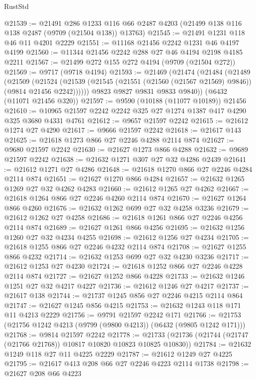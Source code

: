 \begin{lexlean}{RustStd}
\begin{coremodule}
@21539 := @21491
    @286
    @1233
    @116
    @66
    @2487
    @4203
    (@21499 @138 @116 @138 @2487 (@9709 (@21504 @138)) @13763)
@21545 := @21491 @1231 @118 @46 @11 @4201 @2229
@21551 := @11168 @21456 @2242 @1231 @46 @4197 @4199
@21560 := @11344 @21456 @2242 @288 @27 @46 @4194 @2198 @4185 @2211
@21567 := @21499 @272 @155 @272 @4194 (@9709 (@21504 @272))
@21569 := @9717 (@9718 @4194)
@21593 := @21469
    (@21474
      (@21484
        (@21489
          (@21509
            (@21524
              (@21539 (@21545 (@21551 (@21560 (@21567 @21569) @9846)) (@9814 @21456 @2242))))))
        @9823
        @9827
        @9831
        @9833
        @9840))
    (@6432 (@11071 @21456 @320))
@21597 := @9590 (@10188 (@11077 @10189)) @21456
@21610 := @10965 @21597 @2242 @2242 @325 @27 @1274 @1387 @417 @4290 @325 @3680 @4331 @4761
@21612 := @9657 @21597 @2242
@21615 := @21612 @1274 @27 @4290
@21617 := @9666 @21597 @2242
@21618 := @21617 @143
@21625 := @21618 @1273 @866 @27 @2246 @4288 @2114 @874
@21627 := @9680 @21597 @2242
@21630 := @21627 @1273 @866 @4288
@21632 := @9689 @21597 @2242
@21638 := @21632 @1271 @307 @27 @32 @4286 @2439
@21641 := @21612 @1271 @27 @4286
@21648 := @21618 @1270 @866 @27 @2246 @4284 @2114 @874
@21651 := @21627 @1270 @866 @4284
@21657 := @21632 @1265 @1269 @27 @32 @4262 @4283
@21660 := @21612 @1265 @27 @4262
@21667 := @21618 @1264 @866 @27 @2246 @4260 @2114 @874
@21670 := @21627 @1264 @866 @4260
@21676 := @21632 @1262 @699 @27 @32 @4258 @3236
@21679 := @21612 @1262 @27 @4258
@21686 := @21618 @1261 @866 @27 @2246 @4256 @2114 @874
@21689 := @21627 @1261 @866 @4256
@21695 := @21632 @1256 @1260 @27 @32 @4234 @4255
@21698 := @21612 @1256 @27 @4234
@21705 := @21618 @1255 @866 @27 @2246 @4232 @2114 @874
@21708 := @21627 @1255 @866 @4232
@21714 := @21632 @1253 @699 @27 @32 @4230 @3236
@21717 := @21612 @1253 @27 @4230
@21724 := @21618 @1252 @866 @27 @2246 @4228 @2114 @874
@21727 := @21627 @1252 @866 @4228
@21733 := @21632 @1246 @1251 @27 @32 @4217 @4227
@21736 := @21612 @1246 @27 @4217
@21737 := @21617 @138
@21744 := @21737 @1245 @856 @27 @2246 @4215 @2114 @864
@21747 := @21627 @1245 @856 @4215
@21753 := @21632 @1243 @118 @171 @11 @4213 @2229
@21756 := @9791 @21597 @2242 @171
@21766 := @21753 (@21756 @1242 @4213 (@9799 (@9800 @4213)) (@6432 (@9805 @1242 @171)))
@21768 := @9814 @21597 @2242
@21778 := @21733 (@21736 (@21744 (@21747 (@21766 @21768)) @10817 @10820 @10823 @10825 @10830))
@21784 := @21632 @1249 @118 @27 @11 @4225 @2229
@21787 := @21612 @1249 @27 @4225
@21795 := @21617 @413 @208 @66 @27 @2246 @4223 @2114 @1738
@21798 := @21627 @208 @66 @4223

\end{coremodule}
\end{lexlean}
